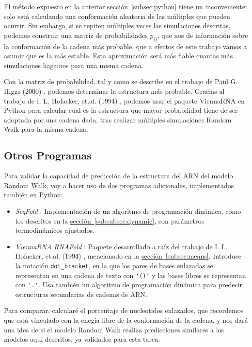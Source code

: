 \documentclass[a4paper,11pt,titlepage]{article}
\newcommand{\nr}[2][sección]{\hyperref[#2]{#1~\ref{#2}}}
\theoremstyle{definition}
\begin{document}
El método expuesto en la anterior \nr[sección]{subsec:python} tiene un inconveniente: solo está calculando una conformación aleatoria de las múltiples que pueden ocurrir. Sin embargo, si se repiten múltiples veces las simulaciones descritas, podemos construir una matriz de probabilidades $p_{ij}$, que nos de información sobre la conformación de la cadena más probable, que a efectos de este trabajo vamos a asumir que es la más estable. Esta aproximación será más fiable cuantas más simulaciones hagamos para una misma cadena.

Con la matriz de probabilidad, tal y como se describe en el trabajo de Paul G. Higgs (2000) \cite{phiggs}, podemos determinar la estructura más probable. Gracias al trabajo de I. L. Hofacker, et.al. (1994) \cite{hofacker}, podemos usar el paquete ViennaRNA en Python para calcular cual es la estructura que mayor probabilidad tiene de ser adoptada por una cadena dada, tras realizar múltiples simulaciones Random Walk para la misma cadena.


\subsection{Otros Programas}\label{subsec:packages}

Para validar la capacidad de predicción de la estructura del ARN del modelo Random Walk, voy a hacer uso de dos programas adicionales, implementados también en Python:

\begin{itemize}
    \item \textit{SeqFold} \cite{seqfold}: Implementación de un algoritmo de programación dinámica, como los descritos en la \nr[sección]{subsubsec:dynamic}, con parámetros termodinámicos ajustados.
    \item \textit{ViennaRNA RNAFold} \cite{viennarna}: Paquete desarrollado a raíz del trabajo de  I. L. Hofacker, et.al. (1994) \cite{hofacker}, mencionado en la \nr[sección]{subsec:means}. Introduce la notación \verb|dot_bracket|, en la que los pares de bases enlazadas se representan en una cadena de texto con \verb|'()'| y las bases libres se representan con \verb|'.'|. Usa también un algoritmo de programación dinámica para predecir estructuras secundarias de cadenas de ARN.
\end{itemize}

Para comparar, calcularé el porcentaje de nucleotidos enlazados, que recordemos que está vinculado con la enegía libre de la conformación de la cadena, y nos dará una idea de si el modelo Random Walk realiza predicciones similares a los modelos aquí descritos, ya validados para esta tarea.
\end{document}
